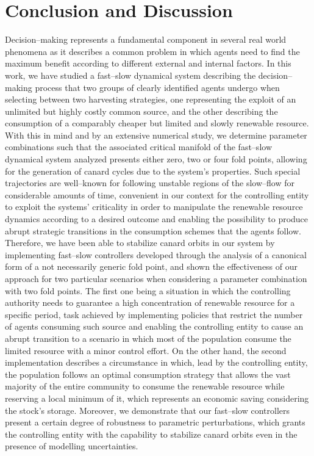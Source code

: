 \documentclass[3p]{elsarticle}
\theoremstyle{plain}
\theoremstyle{remark}
\theoremstyle{definition}
\begin{document}
\section{Conclusion and Discussion}\label{Sec:Discussion}
Decision--making represents a fundamental component in several real world phenomena as it describes a common problem in which agents need to find the maximum benefit according to different external and internal factors. In this work, we have studied a fast--slow dynamical system describing the decision--making process that two groups of clearly identified agents undergo when selecting between two harvesting strategies, one representing the exploit of an unlimited but highly costly common source, and the other describing the consumption of a comparably cheaper but limited and slowly renewable resource. With this in mind and by an extensive numerical study, we determine parameter combinations such that the associated critical manifold of the fast--slow dynamical system analyzed presents either zero, two or four fold points, allowing for the generation of canard cycles due to the system's properties. Such special trajectories are well--known for following unstable regions of the slow--flow for considerable amounts of time, convenient in our context for the controlling entity to exploit the systems' criticality in order to manipulate the renewable resource dynamics according to a desired outcome and enabling the possibility to produce abrupt strategic transitions in the consumption schemes that the agents follow. Therefore, we have been able to stabilize canard orbits in our system by implementing fast--slow controllers developed through the analysis of a canonical form of a not necessarily generic fold point, and shown the effectiveness of our approach for two particular scenarios when considering a parameter combination with two fold points. The first one being a situation in which the controlling authority needs to guarantee a high concentration of renewable resource for a specific period, task achieved by implementing policies that restrict the number of agents consuming such source and enabling the controlling entity to cause an abrupt transition to a scenario in which most of the population consume the limited resource with a minor control effort. On the other hand, the second implementation describes a circumstance in which, lead by the controlling entity, the population follows an optimal consumption strategy that allows the vast majority of the entire community to consume the renewable resource while reserving a local minimum of it, which represents an economic saving considering the stock's storage. Moreover, we demonstrate that our fast--slow controllers present a certain degree of robustness to parametric perturbations, which grants the controlling entity with the capability to stabilize canard orbits even in the presence of modelling uncertainties.
\end{document}
